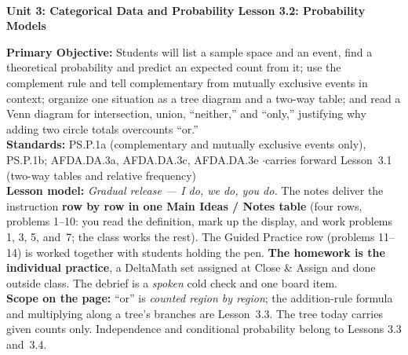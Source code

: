 \documentclass[10pt]{article}
\newcommand{\UnitNumberName}{Unit 3: Categorical Data and Probability \quad}
\newcommand{\LessonNumberName}{Lesson 3.2: Probability Models}
\begin{document}
\begin{center}
    {\Large\bfseries \CourseName \\
    {\small\bfseries \UnitNumberName \LessonNumberName}}
\end{center}

\begin{tcolorbox}[colback=frost, colframe=cerulean, boxrule=0.9pt, arc=2mm,
    left=2mm, right=2mm, top=1.5mm, bottom=1.5mm]
    \textbf{Primary Objective:} Students will list a sample space and an event, find a theoretical
    probability and predict an expected count from it; use the complement rule and tell
    complementary from mutually exclusive events in context; organize one situation as a tree
    diagram and a two-way table; and read a Venn diagram for intersection, union, ``neither,'' and
    ``only,'' justifying why adding two circle totals overcounts ``or.''
    \\[2pt]
    \textbf{Standards:} PS.P.1a (complementary and mutually exclusive events only), PS.P.1b;
    AFDA.DA.3a, AFDA.DA.3c, AFDA.DA.3e \quad$\cdot$\quad carries forward Lesson~3.1 (two-way
    tables and relative frequency)
    \\[2pt]
    \textbf{Lesson model:} \emph{Gradual release --- I do, we do, you do.} The notes deliver the
    instruction \textbf{row by row in one Main Ideas / Notes table} (four rows, problems 1--10: you
    read the definition, mark up the display, and work problems 1, 3, 5, and~7; the class works
    the rest). The Guided Practice row (problems 11--14) is worked together with students holding
    the pen. \textbf{The homework is the individual practice}, a DeltaMath set assigned at Close \&
    Assign and done outside class. The debrief is a \emph{spoken} cold check and one board item.
    \\[2pt]
    \textbf{Scope on the page:} ``or'' is \emph{counted region by region}; the addition-rule
    formula and multiplying along a tree's branches are Lesson~3.3. The tree today carries given
    counts only. Independence and conditional probability belong to Lessons 3.3 and~3.4.
\end{tcolorbox}
\end{document}
